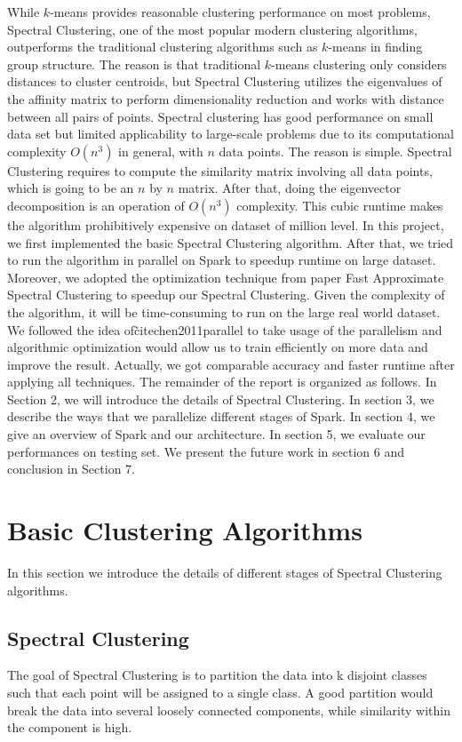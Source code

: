 \documentclass{acm_proc_article-sp}
\begin{document}
While $k$-means provides reasonable clustering performance on most problems, 
Spectral Clustering, one of the most popular modern clustering algorithms, outperforms the traditional clustering algorithms such as $k$-means in finding group structure. The reason is that traditional $k$-means clustering only considers distances to cluster centroids, but Spectral Clustering utilizes the eigenvalues of the affinity matrix to perform dimensionality reduction and works with distance between all pairs of points. Spectral clustering has good performance on small data set but limited applicability to large-scale problems due to its computational complexity $O(n^3)$ in general, with $n$ data points. The reason is simple. Spectral Clustering requires to compute the similarity matrix involving all data points, which is going to be an $n$ by $n$ matrix. After that, doing the eigenvector decomposition is an operation of 
$O(n^3)$ complexity. This cubic runtime makes the algorithm prohibitively expensive on dataset of million level. In this project, we first implemented the basic Spectral Clustering algorithm. After that, we tried to run the algorithm in parallel on Spark to speedup runtime on large dataset. Moreover, we adopted the optimization technique from paper Fast Approximate Spectral Clustering \cite{yan2009fast} to speedup our Spectral Clustering. Given the complexity of the algorithm, it will be time-consuming to run on the large real world dataset. We followed the idea of\~cite{chen2011parallel} to take usage of the parallelism and algorithmic optimization would allow us to train efficiently on more data and improve the result. Actually, we got comparable accuracy and faster runtime after applying all techniques. The remainder of the report is organized as follows. In Section 2, we will introduce the details of Spectral Clustering. In section 3, we describe the ways that we parallelize different stages of Spark. In section 4, we give an overview of Spark and our architecture. In section 5,  we evaluate our performances on testing set. We present the future work in section 6 and conclusion in Section 7.
\section{Basic Clustering Algorithms}
In this section we introduce the details of different stages of Spectral Clustering algorithms.
\subsection{Spectral Clustering}
The goal of Spectral Clustering is to partition the data into k disjoint classes such that each point will be assigned to a single class. A good partition would break the data into several loosely connected components, while similarity within the component is high.
\end{document}
